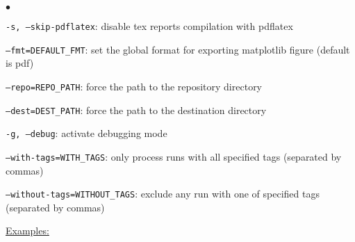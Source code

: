 \documentclass[a4paper,10pt,twoside]{csshortdoc}
\begin{document}
\begin{list}{$\bullet$}{}
\item \texttt{-s, --skip-pdflatex}: disable tex reports compilation with pdflatex
\item \texttt{--fmt=DEFAULT\_FMT}: set the global format for exporting matplotlib figure (default is pdf)
\item \texttt{--repo=REPO\_PATH}: force the path to the repository directory
\item \texttt{--dest=DEST\_PATH}: force the path to the destination directory
\item \texttt{-g, --debug}: activate debugging mode
\item \texttt{--with-tags=WITH\_TAGS}: only process runs with all specified tags (separated by commas)
\item \texttt{--without-tags=WITHOUT\_TAGS}: exclude any run with one of specified tags (separated by commas)
\end{list}

\underline{Examples:}
\end{document}
